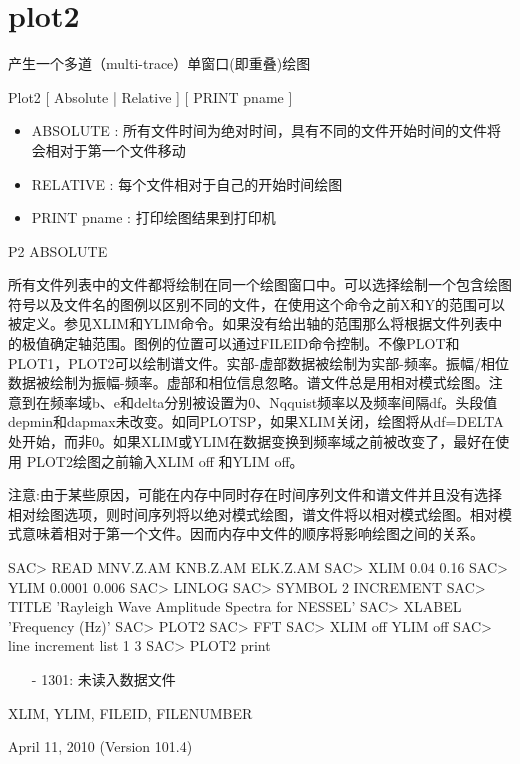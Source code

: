 \section{plot2}
\label{cmd:plot2}

产生一个多道（multi-trace）单窗口(即重叠)绘图

Plot2 [ Absolute | Relative ] [ PRINT pname ]

\begin{itemize}
\item ABSOLUTE : 所有文件时间为绝对时间，具有不同的文件开始时间的文件将会相对于第一个文件移动 
\item RELATIVE : 每个文件相对于自己的开始时间绘图 
\item PRINT {pname} : 打印绘图结果到打印机 
\end{itemize}

P2 ABSOLUTE

所有文件列表中的文件都将绘制在同一个绘图窗口中。可以选择绘制一个包含绘图符号以及文件名的图例以区别不同的文件，在使用这个命令之前X和Y的范围可以被定义。参见XLIM和YLIM命令。如果没有给出轴的范围那么将根据文件列表中的极值确定轴范围。图例的位置可以通过FILEID命令控制。不像PLOT和PLOT1，PLOT2可以绘制谱文件。实部-虚部数据被绘制为实部-频率。振幅/相位数据被绘制为振幅-频率。虚部和相位信息忽略。谱文件总是用相对模式绘图。注意到在频率域b、e和delta分别被设置为0、Nqquist频率以及频率间隔df。头段值depmin和dapmax未改变。如同PLOTSP，如果XLIM关闭，绘图将从df=DELTA处开始，而非0。如果XLIM或YLIM在数据变换到频率域之前被改变了，最好在使用	PLOT2绘图之前输入XLIM off 和YLIM off。

注意:由于某些原因，可能在内存中同时存在时间序列文件和谱文件并且没有选择相对绘图选项，则时间序列将以绝对模式绘图，谱文件将以相对模式绘图。相对模式意味着相对于第一个文件。因而内存中文件的顺序将影响绘图之间的关系。

\begin{SACCode}
SAC> READ MNV.Z.AM KNB.Z.AM ELK.Z.AM
SAC> XLIM 0.04 0.16
SAC> YLIM 0.0001 0.006
SAC> LINLOG
SAC> SYMBOL 2 INCREMENT
SAC> TITLE 'Rayleigh Wave Amplitude Spectra for NESSEL'
SAC> XLABEL 'Frequency (Hz)'
SAC> PLOT2
SAC> FFT
SAC> XLIM off YLIM off
SAC> line increment list 1 3
SAC> PLOT2 print
\end{SACCode}

\begin{itemize}
\item[-]1301: 未读入数据文件
\end{itemize}

XLIM, YLIM, FILEID, FILENUMBER

April 11, 2010 (Version 101.4)
